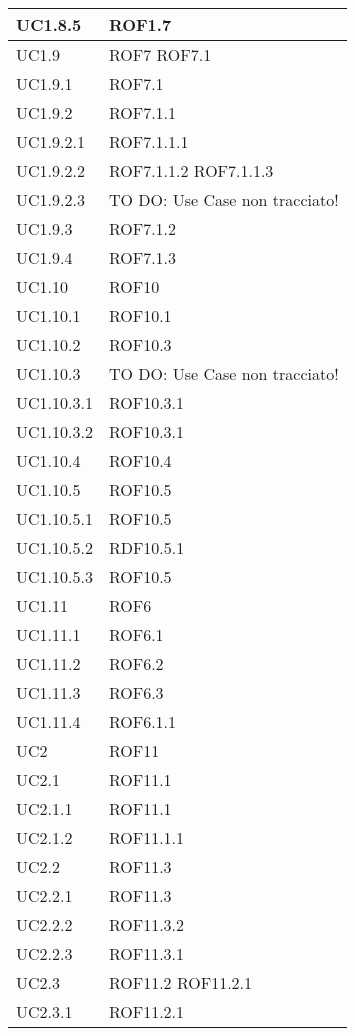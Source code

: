 \begin{center}
\begin{longtable}{| p{4cm} | p{4cm} |}
UC1.8.5 & ROF1.7 \\
\hline
UC1.9 & ROF7 \newline ROF7.1 \\
\hline
UC1.9.1 & ROF7.1 \\
\hline
UC1.9.2 & ROF7.1.1 \\
\hline
UC1.9.2.1 & ROF7.1.1.1 \\
\hline
UC1.9.2.2 & ROF7.1.1.2 \newline ROF7.1.1.3 \\
\hline
UC1.9.2.3 & TO DO: Use Case non tracciato! \\
\hline
UC1.9.3 & ROF7.1.2 \\
\hline
UC1.9.4 & ROF7.1.3 \\
\hline
UC1.10 & ROF10 \\
\hline
UC1.10.1 & ROF10.1 \\
\hline
UC1.10.2 & ROF10.3 \\
\hline
UC1.10.3 & TO DO: Use Case non tracciato! \\
\hline
UC1.10.3.1 & ROF10.3.1 \\
\hline
UC1.10.3.2 & ROF10.3.1 \\
\hline
UC1.10.4 & ROF10.4 \\
\hline
UC1.10.5 & ROF10.5 \\
\hline
UC1.10.5.1 & ROF10.5 \\
\hline
UC1.10.5.2 & RDF10.5.1 \\
\hline
UC1.10.5.3 & ROF10.5 \\
\hline
UC1.11 & ROF6 \\
\hline
UC1.11.1 & ROF6.1 \\
\hline
UC1.11.2 & ROF6.2 \\
\hline
UC1.11.3 & ROF6.3 \\
\hline
UC1.11.4 & ROF6.1.1 \\
\hline
UC2 & ROF11 \\
\hline
UC2.1 & ROF11.1 \\
\hline
UC2.1.1 & ROF11.1 \\
\hline
UC2.1.2 & ROF11.1.1 \\
\hline
UC2.2 & ROF11.3 \\
\hline
UC2.2.1 & ROF11.3 \\
\hline
UC2.2.2 & ROF11.3.2 \\
\hline
UC2.2.3 & ROF11.3.1 \\
\hline
UC2.3 & ROF11.2 \newline ROF11.2.1 \\
\hline
UC2.3.1 & ROF11.2.1 \\

\end{longtable}
\end{center}
